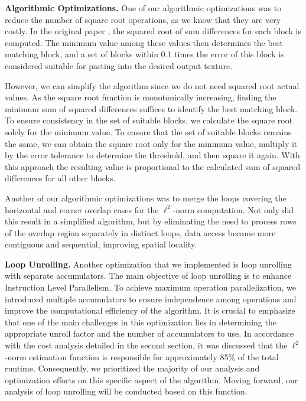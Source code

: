 \documentclass[letterpaper]{article}
\newcommand{\mypar}[1]{{\bf #1.}}
\begin{document}
\mypar{Algorithmic Optimizations} One of our algorithmic optimizations was to reduce the number of square root operations, as we know that they are very costly. In the original paper \cite{Efros:01}, the squared root of sum differences for each block is computed. The minimum value among these values then determines the best matching block, and a set of blocks within 0.1 times the error of this block is considered suitable for pasting into the desired output texture.

However, we can simplify the algorithm since we do not need squared root actual values. As the square root function is monotonically increasing, finding the minimum sum of squared differences suffices to identify the best matching block. To ensure consistency in the set of suitable blocks, we calculate the square root solely for the minimum value. To ensure that the set of suitable blocks remains the same, we can obtain the square root only for the minimum value, multiply it by the error tolerance to determine the threshold, and then square it again. With this approach the resulting value is proportional to the calculated sum of squared differences for all other blocks.

Another of our algorithmic optimizations was to merge the loops covering the horizontal and corner overlap cases for the $\ell ^2$-norm computation. Not only did this result in a simplified algorithm, but by eliminating the need to process rows of the overlap region separately in distinct loops, data access became more contiguous and sequential, improving spatial locality.

\mypar{Loop Unrolling} 
Another optimization that we implemented is loop unrolling with separate accumulators. The main objective of loop unrolling is to enhance Instruction Level Parallelism. To achieve maximum operation parallelization, we introduced multiple accumulators to ensure independence among operations and improve the computational efficiency of the algorithm. It is crucial to emphasize that one of the main challenges in this optimization lies in determining the appropriate unroll factor and the number of accumulators to use. 
In accordance with the cost analysis detailed in the second section, it was discussed that the $\ell^2$-norm estimation function is responsible for approximately 85\% of the total runtime. Consequently, we prioritized the majority of our analysis and optimization efforts on this specific aspect of the algorithm. Moving forward, our analysis of loop unrolling will be conducted based on this function.
\end{document}
